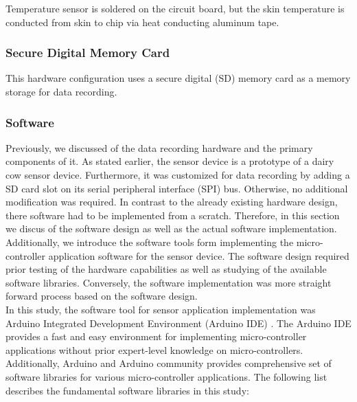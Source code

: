 \documentclass[english,12pt,a4paper,pdftex,elec,utf8]{aaltothesis}
\begin{document}
Temperature sensor is soldered on the circuit board, but the skin temperature is conducted from skin to chip via heat conducting aluminum tape.

\subsubsection*{Secure Digital Memory Card}

This hardware configuration uses a secure digital (SD) memory card as a memory storage for data recording.



\subsubsection{Software} \label{softwaresection}

Previously, we discussed of the data recording hardware and the primary components of it. As stated earlier, the sensor device is a prototype of a dairy cow sensor device. Furthermore, it was customized for data recording by adding a SD card slot on its serial peripheral interface (SPI) bus. Otherwise, no additional modification was required. In contrast to the already existing hardware design, there software had to be implemented from a scratch. Therefore, in this section we discus of the software design as well as the actual software implementation. Additionally, we introduce the software tools form implementing the micro-controller application software for the sensor device. The software design required prior testing of the hardware capabilities as well as studying of the available software libraries. Conversely, the software implementation was more straight forward process based on the software design. \\

In this study, the software tool for sensor application implementation was Arduino Integrated Development Environment (Arduino IDE) \cite{arduinoide}.  The Arduino IDE provides a fast and easy environment for implementing micro-controller applications without prior expert-level knowledge on micro-controllers. Additionally, Arduino and Arduino community provides comprehensive set of software libraries for various micro-controller applications. The following list describes the fundamental software libraries in this study:
\end{document}
